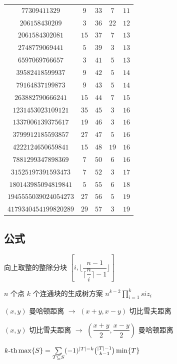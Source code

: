 \documentclass[12pt]{ctexart}
\begin{document}
\begin{table}[H]
\begin{tabular}{|c|c|c|c|c|}
		$77309411329$         & $9$   & $33$ & $7$       & $11$ \\
		$206158430209$        & $3$   & $36$ & $22$      & $12$ \\
		$2061584302081$       & $15$  & $37$ & $7$       & $13$ \\
		$2748779069441$       & $5$   & $39$ & $3$       & $13$ \\
		$6597069766657$       & $3$   & $41$ & $5$       & $13$ \\
		$39582418599937$      & $9$   & $42$ & $5$       & $14$ \\
		$79164837199873$      & $9$   & $43$ & $5$       & $14$ \\
		$263882790666241$     & $15$  & $44$ & $7$       & $15$ \\
		$1231453023109121$    & $35$  & $45$ & $3$       & $16$ \\
		$1337006139375617$    & $19$  & $46$ & $3$       & $16$ \\
		$3799912185593857$    & $27$  & $47$ & $5$       & $16$ \\
		$4222124650659841$    & $15$  & $48$ & $19$      & $16$ \\
		$7881299347898369$    & $7$   & $50$ & $6$       & $16$ \\
		$31525197391593473$   & $7$   & $52$ & $3$       & $17$ \\
		$180143985094819841$  & $5$   & $55$ & $6$       & $18$ \\
		$1945555039024054273$ & $27$  & $56$ & $5$       & $19$ \\
		$4179340454199820289$ & $29$  & $57$ & $3$       & $19$ \\
		\bottomrule
	\end{tabular}

\end{table}
\subsection{公式}

向上取整的整除分块 $[i,\lfloor\dfrac{n-1}{\lceil\dfrac ni \rceil-1}\rfloor]$

$n$ 个点 $k$ 个连通块的生成树方案 $n^{k-2}\prod\limits_{i=1}^k siz_i$

$(x,y)$ 曼哈顿距离 $\to$ $(x+y,x-y)$ 切比雪夫距离

$(x,y)$ 切比雪夫距离 $\to$ $(\dfrac{x+y}{2},\dfrac{x-y}{2})$ 曼哈顿距离

$k\text{-th}\max\{S\}=\sum\limits_{T\subseteq S}(-1)^{|T|-k}\tbinom{|T|-1}{k-1}\min\{T\}$
\end{document}
